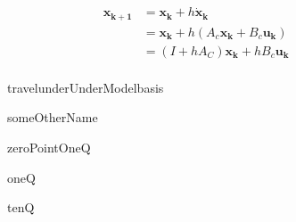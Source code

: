 \documentclass[11pt, a4paper, USenglish]{article} %
\renewcommand{\vec}[1]{\mathbf{#1}}
\newlength{\figureheight}
\newlength{\figurewidth}
\begin{document}
\begin{align*}
    \vec{x_{k+1}} &= \vec{x_k} + h\vec{\dot{x}_k} \\
                  &= \vec{x_k} + h(A_c\vec{x_k} + B_c \vec{u_k}) \\  
                  &= (I + hA_C)\vec{x_k} + hB_c \vec{u_k} \\  
\end{align*}


\begin{figure}[H] 
        \centering
        \setlength{\figureheight}{6cm}
        \setlength{\figurewidth}{10cm}
        
        \caption{travelunderUnderModelbasis} 
\label{fig:figure4} 
\end{figure}

\begin{figure}[H] 
        \centering
        \setlength{\figureheight}{6cm}
        \setlength{\figurewidth}{10cm}
        
        \caption{someOtherName} 
\label{fig:figure5} 
\end{figure}

\begin{figure}[H] 
        \centering
        \setlength{\figureheight}{6cm}
        \setlength{\figurewidth}{10cm}
        
        \caption{zeroPointOneQ} 
\label{fig:figure3} 
\end{figure}

\begin{figure}[H] 
        \centering
        \setlength{\figureheight}{6cm}
        \setlength{\figurewidth}{10cm}
        
        \caption{oneQ} 
\label{fig:figure1}
\end{figure}

\begin{figure}[H] 
        \centering
        \setlength{\figureheight}{6cm}
        \setlength{\figurewidth}{10cm}
        
        \caption{tenQ} 
\label{fig:figure2} 
\end{figure}
\end{document}
